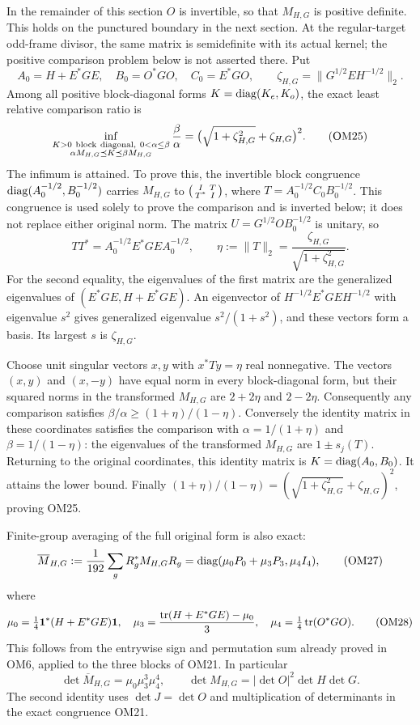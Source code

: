 In the remainder of this section $O$ is invertible, so that $M_{H,G}$
is positive definite.  This holds on the punctured boundary in
the next section.  At the regular-target odd-frame divisor, the
same matrix is semidefinite with its actual kernel; the positive
comparison problem below is not asserted there.
Put
\[
A_0=H+E^*GE,\quad B_0=O^*GO,\quad C_0=E^*GO,\qquad
\zeta_{H,G}=\|G^{1/2}EH^{-1/2}\|_2 .
\tag{OM24}
\]
Among all positive block-diagonal forms $K=\operatorname{diag}(K_e,K_o)$,
the exact least relative comparison ratio is
\[
\inf_{\substack{K>0\ {\rm block\ diagonal},\ 0<\alpha\le\beta\\
                 \alpha M_{H,G}\preceq K\preceq\beta M_{H,G}}}
\frac{\beta}{\alpha}
=\bigl(\sqrt{1+\zeta_{H,G}^2}+\zeta_{H,G}\bigr)^2.
\tag{OM25}
\]
The infimum is attained.  To prove this, the invertible block
congruence $\operatorname{diag}(A_0^{-1/2},B_0^{-1/2})$ carries $M_{H,G}$ to
$\begin{psmallmatrix}I&T\\T^*&I\end{psmallmatrix}$, where
$T=A_0^{-1/2}C_0B_0^{-1/2}$.  This congruence is used solely
to prove the comparison and is inverted below; it does not
replace either original norm.  The matrix
$U=G^{1/2}OB_0^{-1/2}$ is unitary, so
\[
TT^*=A_0^{-1/2}E^*GEA_0^{-1/2},\qquad
\eta:=\|T\|_2=\frac{\zeta_{H,G}}{\sqrt{1+\zeta_{H,G}^2}}.
\tag{OM26}
\]
For the second equality, the eigenvalues of the first matrix are
the generalized eigenvalues of $(E^*GE,H+E^*GE)$.
An eigenvector of $H^{-1/2}E^*GEH^{-1/2}$ with eigenvalue
$s^2$ gives generalized eigenvalue $s^2/(1+s^2)$, and these
vectors form a basis.  Its largest $s$ is $\zeta_{H,G}$.

Choose unit singular vectors $x,y$ with $x^*Ty=\eta$ real
nonnegative.  The vectors $(x,y)$ and $(x,-y)$ have equal
norm in every block-diagonal form, but their squared norms in
the transformed $M_{H,G}$ are $2+2\eta$ and $2-2\eta$.
Consequently any comparison satisfies
$\beta/\alpha\ge(1+\eta)/(1-\eta)$.
Conversely the identity matrix in these coordinates satisfies
the comparison with
$\alpha=1/(1+\eta)$ and $\beta=1/(1-\eta)$:
the eigenvalues of the transformed $M_{H,G}$ are $1\pm s_j(T)$.
Returning to the original coordinates, this identity matrix is
$K=\operatorname{diag}(A_0,B_0)$.  It attains the lower bound.
Finally $(1+\eta)/(1-\eta)=
(\sqrt{1+\zeta_{H,G}^2}+\zeta_{H,G})^2$, proving OM25.

Finite-group averaging of the full original form is also exact:
\[
\overline M_{H,G}
 :=\frac1{192}\sum_gR_g^*M_{H,G}R_g
 =\operatorname{diag}(\mu_0P_0+\mu_3P_3,\mu_4I_4),
\tag{OM27}
\]
where
\[
\mu_0=\tfrac14\mathbf 1^*(H+E^*GE)\mathbf 1,\quad
\mu_3=\frac{\operatorname{tr}(H+E^*GE)-\mu_0}{3},\quad
\mu_4=\tfrac14\operatorname{tr}(O^*GO).
\tag{OM28}
\]
This follows from the entrywise sign and permutation sum already
proved in OM6, applied to the three blocks of OM21.  In particular
\[
\det\overline M_{H,G}=\mu_0\mu_3^3\mu_4^4,\qquad
\det M_{H,G}=|\det O|^2\det H\det G.
\tag{OM29}
\]
The second identity uses $\det J=\det O$ and multiplication of
determinants in the exact congruence OM21.

